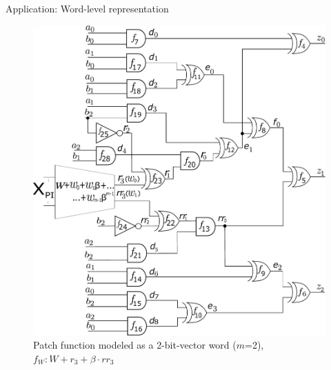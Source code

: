 \begin{frame}{\large Application: Word-level representation}
\begin{figure}[hbt]
\centering
    \includegraphics[scale = 0.24]{mas_3_ddc_mfr_b.pdf}
    \caption*{
    Patch function modeled as a 2-bit-vector word ($m$=2), 
    $f_W: W+ r_3 + \beta \cdot rr_3$}
\end{figure}
\end{frame}


